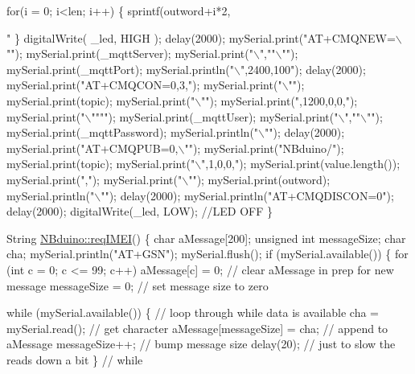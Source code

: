 \begin{DoxyCodeInclude}
    \textcolor{keywordflow}{for}(i = 0; i<len; i++) \{
        sprintf(outword+i*2, \textcolor{stringliteral}{"%
    \}
    digitalWrite( \_led, HIGH );
    delay(2000);
    mySerial.print(\textcolor{stringliteral}{"AT+CMQNEW=\(\backslash\)""});
    mySerial.print(\_mqttServer);
    mySerial.print(\textcolor{stringliteral}{"\(\backslash\)","}\textcolor{stringliteral}{"\(\backslash\)""});
    mySerial.print(\_mqttPort);
    mySerial.println(\textcolor{stringliteral}{"\(\backslash\)",2400,100"});
    delay(2000);
    mySerial.print(\textcolor{stringliteral}{"AT+CMQCON=0,3,"});
    mySerial.print(\textcolor{stringliteral}{"\(\backslash\)""});
    mySerial.print(topic);
    mySerial.print(\textcolor{stringliteral}{"\(\backslash\)""});
    mySerial.print(\textcolor{stringliteral}{",1200,0,0,"});
    mySerial.print(\textcolor{stringliteral}{"\(\backslash\)""}\textcolor{stringliteral}{""});
    mySerial.print(\_mqttUser);
    mySerial.print(\textcolor{stringliteral}{"\(\backslash\)","}\textcolor{stringliteral}{"\(\backslash\)""});
    mySerial.print(\_mqttPassword);
    mySerial.println(\textcolor{stringliteral}{"\(\backslash\)""});
    delay(2000);
    mySerial.print(\textcolor{stringliteral}{"AT+CMQPUB=0,\(\backslash\)""});
    mySerial.print(\textcolor{stringliteral}{"NBduino/"});
    mySerial.print(topic);
    mySerial.print(\textcolor{stringliteral}{"\(\backslash\)",1,0,0,"});
    mySerial.print(value.length());
    mySerial.print(\textcolor{stringliteral}{","});
    mySerial.print(\textcolor{stringliteral}{"\(\backslash\)""});
    mySerial.print(outword);
    mySerial.println(\textcolor{stringliteral}{"\(\backslash\)""});
    delay(2000);
    mySerial.println(\textcolor{stringliteral}{"AT+CMQDISCON=0"});
    delay(2000);
    digitalWrite(\_led, LOW);    \textcolor{comment}{//LED OFF}
\}

String \mbox{\hyperlink{class_n_bduino_a3d96fbfb52c89cd55e9a7a3f387c6945}{NBduino::reqIMEI}}()
\{
    \textcolor{keywordtype}{char} aMessage[200];
    \textcolor{keywordtype}{unsigned} \textcolor{keywordtype}{int} messageSize;
    \textcolor{keywordtype}{char} cha;
    mySerial.println(\textcolor{stringliteral}{"AT+GSN"});
    mySerial.flush();
    \textcolor{keywordflow}{if} (mySerial.available()) \{
        \textcolor{keywordflow}{for} (\textcolor{keywordtype}{int} c = 0; c <= 99; c++) aMessage[c] = 0;    \textcolor{comment}{// clear aMessage in prep for new message}
        messageSize = 0;                                  \textcolor{comment}{// set message size to zero}

        \textcolor{keywordflow}{while} (mySerial.available()) \{            \textcolor{comment}{// loop through while data is available}
            cha = mySerial.read();                  \textcolor{comment}{// get character}
            aMessage[messageSize] = cha;            \textcolor{comment}{// append to aMessage}
            messageSize++;                          \textcolor{comment}{// bump message size}
            delay(20);                              \textcolor{comment}{// just to slow the reads down a bit}
        \} \textcolor{comment}{// while}

}
\end{DoxyCodeInclude}
